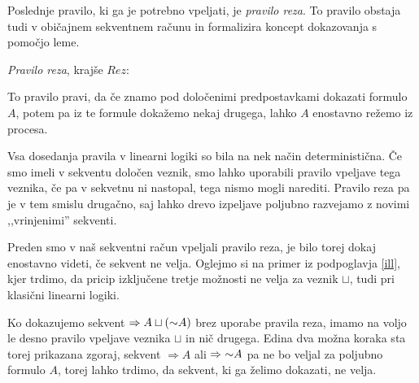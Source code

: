 Poslednje pravilo, ki ga je potrebno vpeljati, je \emph{pravilo reza}. To pravilo obstaja tudi v običajnem sekventnem računu in formalizira koncept dokazovanja s pomočjo leme.

\begin{definicija}
	\emph{Pravilo reza}, krajše $Rez$:
	\begin{prooftree}
	\end{prooftree}
	To pravilo pravi, da če znamo pod določenimi predpostavkami dokazati formulo $A$, potem pa iz te formule dokažemo nekaj drugega, lahko $A$ enostavno režemo iz procesa.
\end{definicija}

\begin{opomba}
	Vsa dosedanja pravila v linearni logiki so bila na nek način deterministična. Če smo imeli v sekventu določen veznik, smo lahko uporabili pravilo vpeljave tega veznika, če pa v sekvetnu ni nastopal, tega nismo mogli narediti. Pravilo reza pa je v tem smislu drugačno, saj lahko drevo izpeljave poljubno razvejamo z novimi ,,vrinjenimi'' sekventi.
\end{opomba}
Preden smo v naš sekventni račun vpeljali pravilo reza, je bilo torej dokaj enostavno videti, če sekvent ne velja. Oglejmo si na primer iz podpoglavja \ref{ill}, kjer trdimo, da pricip izključene tretje možnosti ne velja za veznik $\sqcup$, tudi pri klasični linearni logiki.
\begin{center}
    \begin{bprooftree}
    \end{bprooftree}
    \begin{bprooftree}
    \end{bprooftree}
\end{center}
Ko dokazujemo sekvent $\Rightarrow A \sqcup (\negacija A)$ brez uporabe pravila reza, imamo na voljo le desno pravilo vpeljave veznika $\sqcup$ in nič drugega. Edina dva možna koraka sta torej prikazana zgoraj, sekvent $\Rightarrow A$ ali $\Rightarrow \negacija A$ pa ne bo veljal za poljubno formulo $A$, torej lahko trdimo, da sekvent, ki ga želimo dokazati, ne velja.


